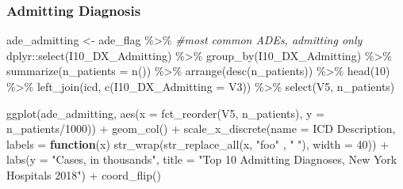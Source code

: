 \documentclass[preprint, 3p,
authoryear]{elsarticle} %
\newenvironment{Shaded}{\begin{snugshade}}{\end{snugshade}}
\newcommand{\AttributeTok}[1]{\textcolor[rgb]{0.77,0.63,0.00}{#1}}
\newcommand{\CommentTok}[1]{\textcolor[rgb]{0.56,0.35,0.01}{\textit{#1}}}
\newcommand{\ControlFlowTok}[1]{\textcolor[rgb]{0.13,0.29,0.53}{\textbf{#1}}}
\newcommand{\DecValTok}[1]{\textcolor[rgb]{0.00,0.00,0.81}{#1}}
\newcommand{\FunctionTok}[1]{\textcolor[rgb]{0.00,0.00,0.00}{#1}}
\newcommand{\NormalTok}[1]{#1}
\newcommand{\OtherTok}[1]{\textcolor[rgb]{0.56,0.35,0.01}{#1}}
\newcommand{\SpecialCharTok}[1]{\textcolor[rgb]{0.00,0.00,0.00}{#1}}
\newcommand{\StringTok}[1]{\textcolor[rgb]{0.31,0.60,0.02}{#1}}
\begin{document}
\hypertarget{admitting-diagnosis}{%
\subsubsection{Admitting Diagnosis}\label{admitting-diagnosis}}

\begin{Shaded}
\begin{Highlighting}[]
\NormalTok{ade\_admitting }\OtherTok{\textless{}{-}}\NormalTok{ ade\_flag }\SpecialCharTok{\%\textgreater{}\%} \CommentTok{\#most common ADEs, admitting only}
\NormalTok{  dplyr}\SpecialCharTok{::}\FunctionTok{select}\NormalTok{(I10\_DX\_Admitting) }\SpecialCharTok{\%\textgreater{}\%}
  \FunctionTok{group\_by}\NormalTok{(I10\_DX\_Admitting) }\SpecialCharTok{\%\textgreater{}\%}
  \FunctionTok{summarize}\NormalTok{(}\AttributeTok{n\_patients =} \FunctionTok{n}\NormalTok{()) }\SpecialCharTok{\%\textgreater{}\%}
  \FunctionTok{arrange}\NormalTok{(}\FunctionTok{desc}\NormalTok{(n\_patients)) }\SpecialCharTok{\%\textgreater{}\%}
  \FunctionTok{head}\NormalTok{(}\DecValTok{10}\NormalTok{) }\SpecialCharTok{\%\textgreater{}\%}
  \FunctionTok{left\_join}\NormalTok{(icd, }\FunctionTok{c}\NormalTok{(}\StringTok{\textquotesingle{}I10\_DX\_Admitting\textquotesingle{}} \OtherTok{=} \StringTok{\textquotesingle{}V3\textquotesingle{}}\NormalTok{)) }\SpecialCharTok{\%\textgreater{}\%}
  \FunctionTok{select}\NormalTok{(V5, n\_patients)}

\FunctionTok{ggplot}\NormalTok{(ade\_admitting, }\FunctionTok{aes}\NormalTok{(}\AttributeTok{x =} \FunctionTok{fct\_reorder}\NormalTok{(V5, n\_patients), }\AttributeTok{y =}\NormalTok{ n\_patients}\SpecialCharTok{/}\DecValTok{1000}\NormalTok{)) }\SpecialCharTok{+}
  \FunctionTok{geom\_col}\NormalTok{() }\SpecialCharTok{+}
  \FunctionTok{scale\_x\_discrete}\NormalTok{(}\AttributeTok{name =} \StringTok{\textquotesingle{}ICD Description\textquotesingle{}}\NormalTok{, }\AttributeTok{labels =} \ControlFlowTok{function}\NormalTok{(x) }\FunctionTok{str\_wrap}\NormalTok{(}\FunctionTok{str\_replace\_all}\NormalTok{(x, }\StringTok{"foo"}\NormalTok{ , }\StringTok{" "}\NormalTok{), }\AttributeTok{width =} \DecValTok{40}\NormalTok{)) }\SpecialCharTok{+}
  \FunctionTok{labs}\NormalTok{(}\AttributeTok{y =} \StringTok{"Cases, in thousands"}\NormalTok{, }\AttributeTok{title =} \StringTok{"Top 10 Admitting Diagnoses, New York Hospitals 2018"}\NormalTok{) }\SpecialCharTok{+}
  \FunctionTok{coord\_flip}\NormalTok{()}
\end{Highlighting}
\end{Shaded}
\end{document}
